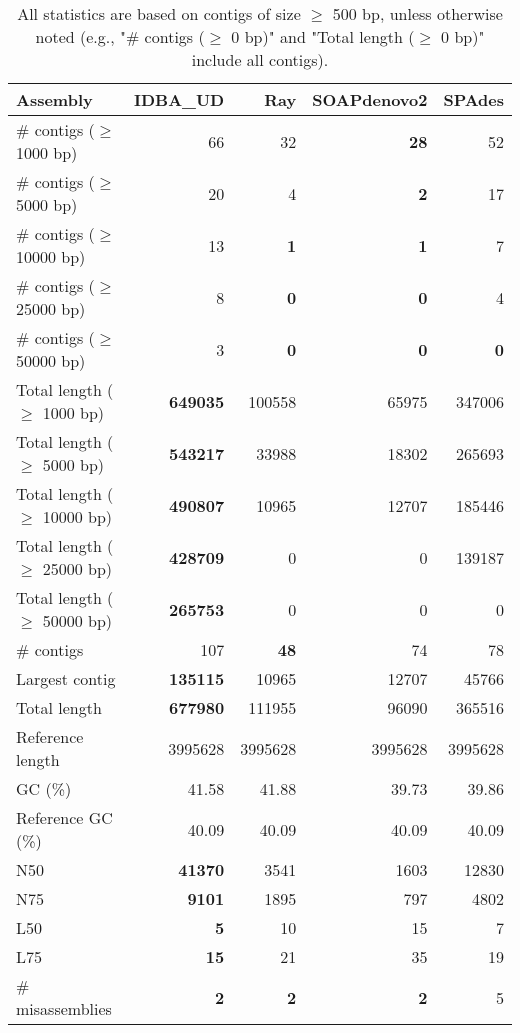 \documentclass[12pt,a4paper]{article}
\begin{document}
\begin{table}[ht]
\begin{center}
\caption{All statistics are based on contigs of size $\geq$ 500 bp, unless otherwise noted (e.g., "\# contigs ($\geq$ 0 bp)" and "Total length ($\geq$ 0 bp)" include all contigs).}
\begin{tabular}{|l*{4}{|r}|}
\hline
Assembly & IDBA\_UD & Ray & SOAPdenovo2 & SPAdes \\ \hline
\# contigs ($\geq$ 1000 bp) & 66 & 32 & {\bf 28} & 52 \\ \hline
\# contigs ($\geq$ 5000 bp) & 20 & 4 & {\bf 2} & 17 \\ \hline
\# contigs ($\geq$ 10000 bp) & 13 & {\bf 1} & {\bf 1} & 7 \\ \hline
\# contigs ($\geq$ 25000 bp) & 8 & {\bf 0} & {\bf 0} & 4 \\ \hline
\# contigs ($\geq$ 50000 bp) & 3 & {\bf 0} & {\bf 0} & {\bf 0} \\ \hline
Total length ($\geq$ 1000 bp) & {\bf 649035} & 100558 & 65975 & 347006 \\ \hline
Total length ($\geq$ 5000 bp) & {\bf 543217} & 33988 & 18302 & 265693 \\ \hline
Total length ($\geq$ 10000 bp) & {\bf 490807} & 10965 & 12707 & 185446 \\ \hline
Total length ($\geq$ 25000 bp) & {\bf 428709} & 0 & 0 & 139187 \\ \hline
Total length ($\geq$ 50000 bp) & {\bf 265753} & 0 & 0 & 0 \\ \hline
\# contigs & 107 & {\bf 48} & 74 & 78 \\ \hline
Largest contig & {\bf 135115} & 10965 & 12707 & 45766 \\ \hline
Total length & {\bf 677980} & 111955 & 96090 & 365516 \\ \hline
Reference length & 3995628 & 3995628 & 3995628 & 3995628 \\ \hline
GC (\%) & 41.58 & 41.88 & 39.73 & 39.86 \\ \hline
Reference GC (\%) & 40.09 & 40.09 & 40.09 & 40.09 \\ \hline
N50 & {\bf 41370} & 3541 & 1603 & 12830 \\ \hline
N75 & {\bf 9101} & 1895 & 797 & 4802 \\ \hline
L50 & {\bf 5} & 10 & 15 & 7 \\ \hline
L75 & {\bf 15} & 21 & 35 & 19 \\ \hline
\# misassemblies & {\bf 2} & {\bf 2} & {\bf 2} & 5 \\ \hline

\end{tabular}
\end{center}
\end{table}
\end{document}
